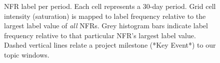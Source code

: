 \documentclass[]{sig-alternate}
\begin{document}
\begin{figure}[]
\centering
{}           
                                             
	\caption[]{NFR label per period. Each cell represents a 30-day period. %
	Grid cell intensity (saturation) is mapped to label frequency relative to the largest label value of \emph{all} NFRs. Grey histogram bars indicate label frequency relative to that particular NFR's largest label value. Dashed vertical lines relate a project milestone (*Key Event*) to our topic windows. 
}
\label{fig:timelines}
\end{figure}

\end{document}
